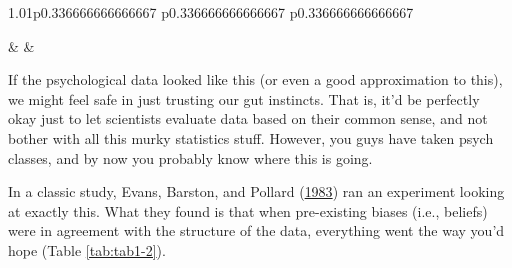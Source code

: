 \documentclass[
]{book}
\begin{document}
\begin{table}[ht]
\begin{centerbox}
\begin{threeparttable}
\begin{tabularx}{1.01\textwidth}{p{} p{} p{}}
\hhline{}

 &
 &
 \tabularnewline[-0.5pt]


\end{tabularx}\captionsetup{justification=raggedright,singlelinecheck=off}
\caption{\label{tab:tab1-1} Validity of arguments}
 
\end{threeparttable}\par\end{centerbox}

\end{table}
 

If the psychological data looked like this (or even a good approximation to this), we might feel safe in just trusting our gut instincts. That is, it'd be perfectly okay just to let scientists evaluate data based on their common sense, and not bother with all this murky statistics stuff. However, you guys have taken psych classes, and by now you probably know where this is going.

In a classic study, Evans, Barston, and Pollard (\protect\hyperlink{ref-Evans1983}{1983}) ran an experiment looking at exactly this. What they found is that when pre-existing biases (i.e., beliefs) were in agreement with the structure of the data, everything went the way you'd hope (Table \ref{tab:tab1-2}).

 
  \providecommand{\huxb}[2]{\arrayrulecolor[RGB]{#1}\global\arrayrulewidth=#2pt}
  \providecommand{\huxvb}[2]{\color[RGB]{#1}\vrule width #2pt}
  \providecommand{\huxtpad}[1]{\rule{0pt}{#1}}
  \providecommand{\huxbpad}[1]{\rule[-#1]{0pt}{#1}}
\end{document}
